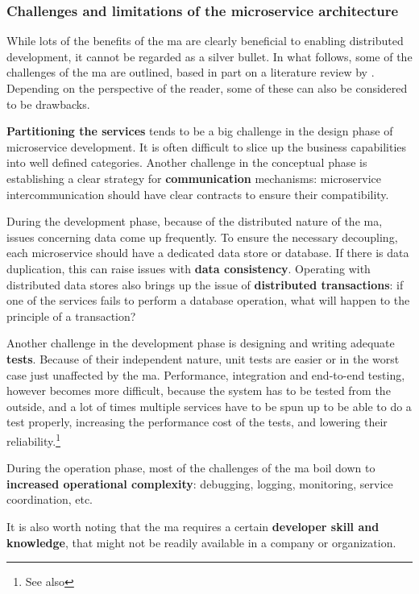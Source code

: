 \subsubsection{Challenges and limitations of the microservice architecture}
\label{sssec:microservice-challenges}

While lots of the benefits of the \gls{ma} are clearly beneficial to enabling
distributed development, it cannot be regarded as a silver bullet. In what
follows, some of the challenges of the \gls{ma} are outlined, based in part on a
literature review by \textcite{Soldani_2018}.
Depending on the perspective of the reader, some of these can also be considered
to be drawbacks.

\textbf{Partitioning the services} tends to be a big challenge in the design
phase of \gls{microservice} development. It is often difficult to slice up the
business capabilities into well defined categories. Another challenge in the
conceptual phase is establishing a clear strategy for \textbf{communication}
mechanisms: \gls{microservice} intercommunication should have clear contracts to
ensure their compatibility.

During the development phase, because of the distributed nature of the \gls{ma},
issues concerning data come up frequently. To ensure the necessary decoupling,
each microservice should have a dedicated data store or database. If there is
data duplication, this can raise issues with \textbf{data consistency}.
Operating with distributed data stores also brings up the issue of
\textbf{distributed transactions}: if one of the services fails to perform a
database operation, what will happen to the principle of a transaction?

Another challenge in the development phase is designing and writing adequate
\textbf{tests}. Because of their independent nature, unit tests are easier or in
the worst case just unaffected by the \gls{ma}. Performance, integration and
end-to-end testing, however becomes more difficult, because the system has to be
tested from the outside, and a lot of times multiple services have to be spun up
to be able to do a test properly, increasing the performance cost of the tests,
and lowering their reliability.\footnote{See also
}

During the operation phase, most of the challenges of the \gls{ma} boil down to
\textbf{increased operational complexity}: debugging, logging,  monitoring,
service coordination, etc. 

It is also worth noting that the \gls{ma} requires a certain \textbf{developer
skill and knowledge}, that might not be readily available in a company or
organization.
